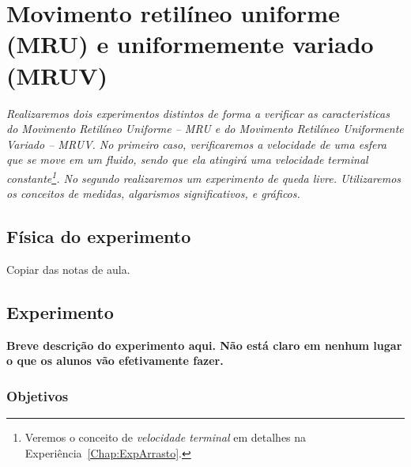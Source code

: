 \chapter{Movimento retilíneo uniforme (MRU) e uniformemente variado (MRUV)}
\label{Chap:ExpMRUMRUV}

\begin{fullwidth}\it
	Realizaremos dois experimentos distintos de forma a verificar as caracteristicas do Movimento Retilíneo Uniforme -- MRU e do Movimento Retilíneo Uniformente Variado -- MRUV. No primeiro caso, verificaremos a velocidade de uma esfera que se move em um fluido, sendo que ela atingirá uma velocidade terminal constante\footnote[][15mm]{Veremos o conceito de \emph{velocidade terminal} em detalhes na Experiência~\ref{Chap:ExpArrasto}.}. No segundo realizaremos um experimento de queda livre. Utilizaremos os conceitos de medidas, algarismos significativos, e gráficos.
\end{fullwidth}

\section{Física do experimento}

Copiar das notas de aula.


\section{Experimento}

\textbf{Breve descrição do experimento aqui. Não está claro em nenhum lugar o que os alunos vão efetivamente fazer.}

\subsection{Objetivos}


